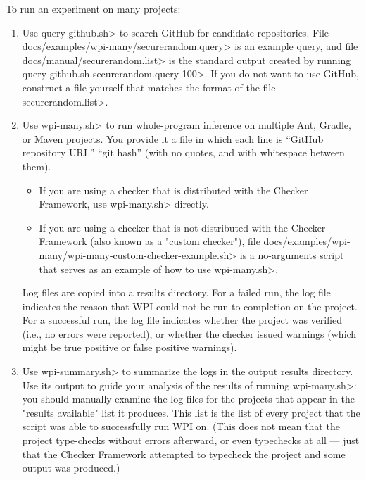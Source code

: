 To run an experiment on many projects:
\begin{enumerate}
\item Use \<query-github.sh> to search GitHub for candidate repositories.
File \<docs/examples/wpi-many/securerandom.query> is an example query, and file
\<docs/manual/securerandom.list> is the standard output
created by running \<query-github.sh securerandom.query 100>. If you do
not want to use GitHub, construct a file yourself that matches the format of
the file \<securerandom.list>.

\item Use \<wpi-many.sh> to run whole-program inference on multiple
Ant, Gradle, or Maven projects.  You provide it a file in which each line
is ``GitHub repository URL'' ``git hash'' (with no quotes, and with
whitespace between them).
\begin{itemize}
\item If you are using a checker that is distributed with the Checker
Framework, use \<wpi-many.sh> directly.
\item If you are using a checker that is not distributed with the Checker
Framework (also known as a "custom checker"), file
\<docs/examples/wpi-many/wpi-many-custom-checker-example.sh> is a no-arguments
script that serves as an example of how to use \<wpi-many.sh>.
\end{itemize}

Log files are copied into a results directory.
For a failed run, the log file indicates the reason that WPI could not
be run to completion on the project.
For a successful run, the log file indicates whether the project was verified
(i.e., no errors were reported), or whether the checker issued warnings
(which might be true positive or false positive warnings).

\item Use \<wpi-summary.sh> to summarize the logs in the output results directory.
Use its output to guide your analysis of the results of running \<wpi-many.sh>:
you should manually examine the log files for the projects that appear in the
"results available" list it produces. This list is the list of every project
that the script was able to successfully run WPI on.  (This does not mean
that the project type-checks without errors afterward, or even typechecks at
all --- just that the Checker Framework attempted to typecheck the project and
some output was produced.)


\end{enumerate}
